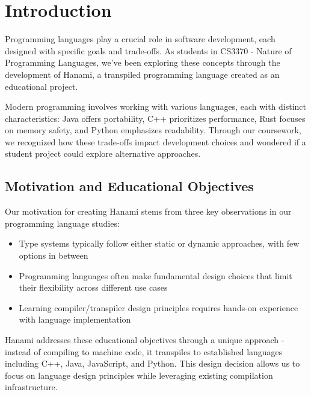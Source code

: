 \documentclass[conference]{IEEEtran}
\begin{document}
\newpage
\tableofcontents
\newpage

\clearpage %
\section{Introduction}
\label{sec:introduction}

Programming languages play a crucial role in software development, each designed with specific goals and trade-offs. As students in CS3370 - Nature of Programming Languages, we've been exploring these concepts through the development of Hanami, a transpiled programming language created as an educational project.

Modern programming involves working with various languages, each with distinct characteristics: Java offers portability, C++ prioritizes performance, Rust focuses on memory safety, and Python emphasizes readability. Through our coursework, we recognized how these trade-offs impact development choices and wondered if a student project could explore alternative approaches.

\subsection{Motivation and Educational Objectives}

Our motivation for creating Hanami stems from three key observations in our programming language studies:

\begin{itemize}
    \item Type systems typically follow either static or dynamic approaches, with few options in between
    \item Programming languages often make fundamental design choices that limit their flexibility across different use cases
    \item Learning compiler/transpiler design principles requires hands-on experience with language implementation
\end{itemize}

Hanami addresses these educational objectives through a unique approach - instead of compiling to machine code, it transpiles to established languages including C++, Java, JavaScript, and Python. This design decision allows us to focus on language design principles while leveraging existing compilation infrastructure.
\end{document}
